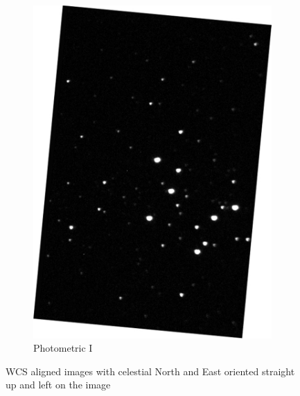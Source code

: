 \documentclass[%
aip,
jmp,
reprint,
floatfix,
nofootinbib
]{revtex4-1}
\begin{document}
\begin{figure}[H]
\begin{subfigure}[]{0.3\textwidth}
			\includegraphics[width=\linewidth]{figs/i.pdf}
			\caption{Photometric I}
			\label{fig:i}
		\end{subfigure}
		\caption{WCS aligned images with celestial North and East oriented straight up and left on the image}
	\end{figure}
\end{document}
